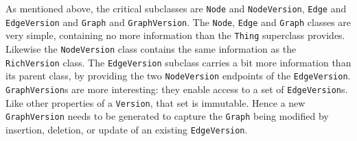 \documentclass{article}
\newcommand{\mantle}{mantle\xspace}
\newcommand{\version}{\texttt{Version}\xspace}
\newcommand{\richversion}{\texttt{RichVersion}\xspace}
\newcommand{\thing}{\texttt{Thing}\xspace}
\newcommand{\node}{\texttt{Node}\xspace}
\newcommand{\edge}{\texttt{Edge}\xspace}
\newcommand{\graph}{\texttt{Graph}\xspace}
\newcommand{\jmh}[1]{{\textcolor{red}{#1---jmh}}}
\begin{document}
As mentioned above, the critical subclasses are \node and
\texttt{NodeVersion}, \edge and \texttt{EdgeVersion} and \graph and
\texttt{GraphVersion}.  The \node, \edge and \graph classes are very simple, containing
no more information than the \thing superclass provides.  Likewise the 
\texttt{NodeVersion} class contains the same information as the \richversion class.
The \texttt{EdgeVersion} subclass carries a bit more information than its parent class, 
by providing the two \texttt{NodeVersion} endpoints of the \texttt{EdgeVersion}.
\texttt{GraphVersion}s are more interesting: they enable access to a set 
of \texttt{EdgeVersion}s.  Like other properties of a \version, that set is immutable.  Hence a new 
\texttt{GraphVersion} needs to be generated to capture the \graph being modified by insertion,
deletion, or update of an existing \texttt{EdgeVersion}.




\end{document}
